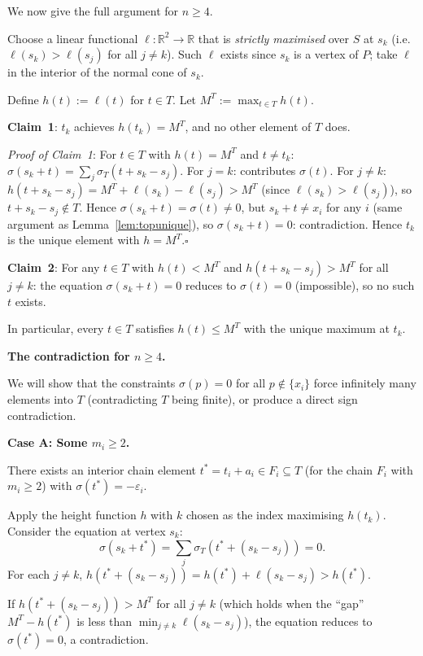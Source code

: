 \documentclass{article}
\begin{document}
We now give the full argument for $n\ge 4$.

Choose a linear functional $\ell:\mathbb{R}^2\to\mathbb{R}$ that is \emph{strictly maximised}
over $S$ at $s_k$ (i.e.\ $\ell(s_k)>\ell(s_j)$ for all $j\ne k$).
Such $\ell$ exists since $s_k$ is a vertex of $P$; take $\ell$ in the interior of
the normal cone of $s_k$.

Define $h(t):=\ell(t)$ for $t\in T$.  Let $M^T:=\max_{t\in T}h(t)$.

\textbf{Claim~1}: $t_k$ achieves $h(t_k)=M^T$, and no other element of $T$ does.

\textit{Proof of Claim~1}: For $t\in T$ with $h(t)=M^T$ and $t\ne t_k$:
$\sigma(s_k+t)=\sum_j\sigma_T(t+s_k-s_j)$.
For $j=k$: contributes $\sigma(t)$.
For $j\ne k$: $h(t+s_k-s_j)=M^T+\ell(s_k)-\ell(s_j)>M^T$ (since $\ell(s_k)>\ell(s_j)$),
so $t+s_k-s_j\notin T$.
Hence $\sigma(s_k+t)=\sigma(t)\ne 0$, but $s_k+t\ne x_i$ for any $i$
(same argument as Lemma~\ref{lem:topunique}), so $\sigma(s_k+t)=0$: contradiction.
Hence $t_k$ is the unique element with $h=M^T$.\quad$\square$

\textbf{Claim~2}: For any $t\in T$ with $h(t)<M^T$ and $h(t+s_k-s_j)>M^T$ for all $j\ne k$:
the equation $\sigma(s_k+t)=0$ reduces to $\sigma(t)=0$ (impossible), so no such $t$ exists.

In particular, every $t\in T$ satisfies $h(t)\le M^T$ with the unique maximum at $t_k$.

\medskip
\noindent\textbf{The contradiction for $n\ge 4$.}

We will show that the constraints $\sigma(p)=0$ for all $p\notin\{x_i\}$ force
infinitely many elements into $T$ (contradicting $T$ being finite), or produce a
direct sign contradiction.

\textbf{Case A: Some $m_i\ge 2$.}

There exists an interior chain element $t^*=t_i+a_i\in F_i\subseteq T$ (for
the chain $F_i$ with $m_i\ge 2$) with $\sigma(t^*)=-\varepsilon_i$.

Apply the height function $h$ with $k$ chosen as the index maximising $h(t_k)$.
Consider the equation at vertex $s_k$:
\[
  \sigma(s_k+t^*) = \sum_j\sigma_T(t^*+(s_k-s_j)) = 0.
\]
For each $j\ne k$, $h(t^*+(s_k-s_j))=h(t^*)+\ell(s_k-s_j)>h(t^*)$.

If $h(t^*+(s_k-s_j))>M^T$ for all $j\ne k$ (which holds when the ``gap''
$M^T-h(t^*)$ is less than $\min_{j\ne k}\ell(s_k-s_j)$), the equation reduces to
$\sigma(t^*)=0$, a contradiction.
\end{document}
